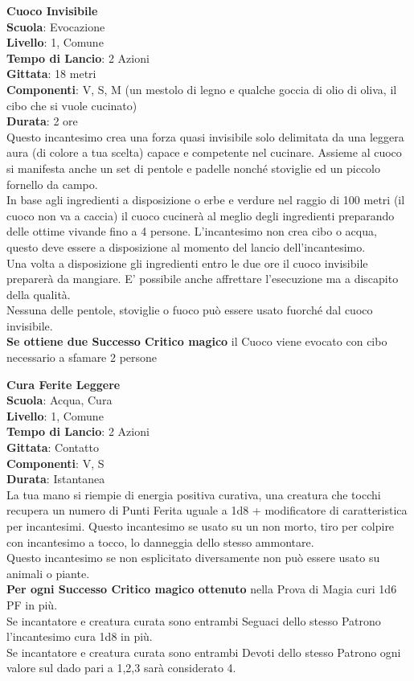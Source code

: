 \begin{multicols}{2}
\medskip\textbf{Cuoco Invisibile}\\
\textbf{Scuola}: Evocazione\\
\textbf{Livello}: 1, Comune\\
\textbf{Tempo di Lancio}: 2 Azioni\\
\textbf{Gittata}: 18 metri\\
\textbf{Componenti}: V, S, M (un mestolo di legno e qualche goccia di olio di oliva, il cibo che si vuole cucinato)\\
\textbf{Durata}: 2 ore\\
Questo incantesimo crea una forza quasi invisibile solo delimitata da una leggera aura (di colore a tua scelta) capace e competente nel cucinare. Assieme al cuoco si manifesta anche un set di pentole e padelle nonché stoviglie ed un piccolo fornello da campo.\\
In base agli ingredienti a disposizione o erbe e verdure nel raggio di 100 metri (il cuoco non va a caccia) il cuoco cucinerà al meglio degli ingredienti preparando delle ottime vivande fino a 4 persone. L'incantesimo non crea cibo o acqua, questo deve essere a disposizione al momento del lancio dell'incantesimo. \\
Una volta a disposizione gli ingredienti entro le due ore il cuoco invisibile preparerà da mangiare. E' possibile anche affrettare l'esecuzione ma a discapito della qualità.\\
Nessuna delle pentole, stoviglie o fuoco può essere usato fuorché dal cuoco invisibile.\\
\textbf{Se ottiene due Successo Critico magico} il Cuoco viene evocato con cibo necessario a sfamare 2 persone

\medskip\textbf{Cura Ferite Leggere}\\
\textbf{Scuola}: Acqua, Cura\\
\textbf{Livello}: 1, Comune\\
\textbf{Tempo di Lancio}: 2 Azioni\\
\textbf{Gittata}: Contatto\\
\textbf{Componenti}: V, S\\
\textbf{Durata}: Istantanea\\
La tua mano si riempie di energia positiva curativa, una creatura che tocchi recupera un numero di Punti Ferita uguale a 1d8 + modificatore di caratteristica per incantesimi. Questo incantesimo se usato su un non morto, tiro per colpire con incantesimo a tocco, lo danneggia dello stesso ammontare.\\
Questo incantesimo se non esplicitato diversamente non può essere usato su animali o piante.\\
\textbf{Per ogni Successo Critico magico ottenuto} nella Prova di Magia curi 1d6 PF in più.\\
Se incantatore e creatura curata sono entrambi Seguaci dello stesso Patrono l'incantesimo cura 1d8 in più.\\
Se incantatore e creatura curata sono entrambi Devoti dello stesso Patrono ogni valore sul dado pari a 1,2,3 sarà considerato 4.


\end{multicols}
